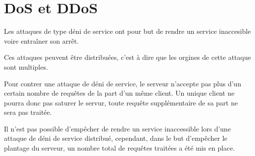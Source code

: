 \clearpage

\section{DoS et DDoS}

Les attaques de type déni de service ont pour but de rendre un service inaccesible voire entraîner son arrêt.

Ces attaques peuvent être distribuées, c'est à dire que les orgines de cette attaque sont multiples.

Pour contrer une attaque de déni de service, le serveur n'accepte pas plus d'un certain nombre de requêtes de la part d'un même client. Un unique client ne pourra donc pas saturer le servur, toute requête supplémentaire de sa part ne sera pas traitée.

Il n'est pas possible d'empêcher de rendre un service inaccessible lors d'une attaque de déni de service distribué, cependant, dans le but d'empêcher le plantage du serveur, un nombre total de requêtes traitées a été mis en place.
